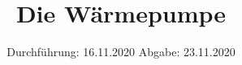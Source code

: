 

\subject{VERSUCH 206}
\title{Die Wärmepumpe}
\date{%
  Durchführung: 16.11.2020
  \hspace{3em}
  Abgabe: 23.11.2020
}



\maketitle
\thispagestyle{empty}
\tableofcontents
\newpage







\printbibliography{}


